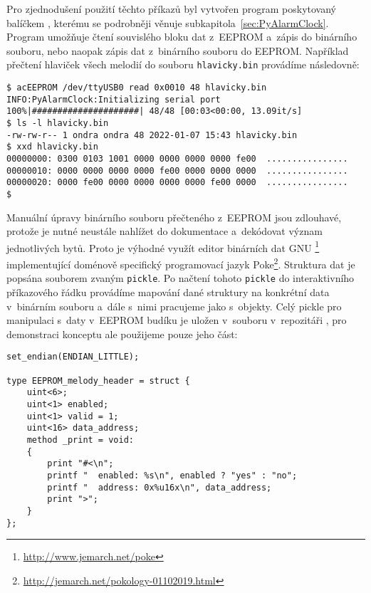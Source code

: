 Pro zjednodušení použití těchto příkazů byl vytvořen program
 poskytovaný balíčkem , kterému se
podrobněji věnuje subkapitola~\vref{sec:PyAlarmClock}.
Program umožňuje čtení souvislého bloku dat z~EEPROM a~zápis do binárního
souboru, nebo naopak zápis dat z~binárního souboru do EEPROM. Například
přečtení hlaviček všech melodií do souboru \texttt{hlavicky.bin} provádíme
následovně:
\begin{lstlisting}[style=terminal]
$ acEEPROM /dev/ttyUSB0 read 0x0010 48 hlavicky.bin
INFO:PyAlarmClock:Initializing serial port
100%|#####################| 48/48 [00:03<00:00, 13.09it/s]
$ ls -l hlavicky.bin
-rw-rw-r-- 1 ondra ondra 48 2022-01-07 15:43 hlavicky.bin
$ xxd hlavicky.bin
00000000: 0300 0103 1001 0000 0000 0000 0000 fe00  ................
00000010: 0000 0000 0000 0000 fe00 0000 0000 0000  ................
00000020: 0000 fe00 0000 0000 0000 0000 fe00 0000  ................
$
\end{lstlisting}

Manuální úpravy binárního souboru přečteného z~EEPROM jsou zdlouhavé, protože
je nutné neustále nahlížet do dokumentace a~dekódovat význam jednotlivých bytů.
Proto je výhodné využít editor binárních dat GNU
\footnote{\url{http://www.jemarch.net/poke}} implementující
doménově specifický programovací jazyk
Poke\footnote{\url{http://jemarch.net/pokology-01102019.html}}.
Struktura dat je popsána souborem zvaným \texttt{pickle}. Po načtení tohoto
\texttt{pickle} do interaktivního příkazového řádku  provádíme
mapování dané struktury na konkrétní data v~binárním souboru a~dále s~nimi
pracujeme jako s~objekty. Celý pickle pro manipulaci s~daty v~EEPROM budíku je
uložen v~souboru  v~repozitáři
, pro demonstraci konceptu ale použijeme pouze jeho část:
\begin{lstlisting}[language=Poke]
set_endian(ENDIAN_LITTLE);

type EEPROM_melody_header = struct {
    uint<6>;
    uint<1> enabled;
    uint<1> valid = 1;
    uint<16> data_address;
    method _print = void:
    {
        print "#<\n";
        printf "  enabled: %s\n", enabled ? "yes" : "no";
        printf "  address: 0x%u16x\n", data_address;
        print ">";
    }
};
\end{lstlisting}


